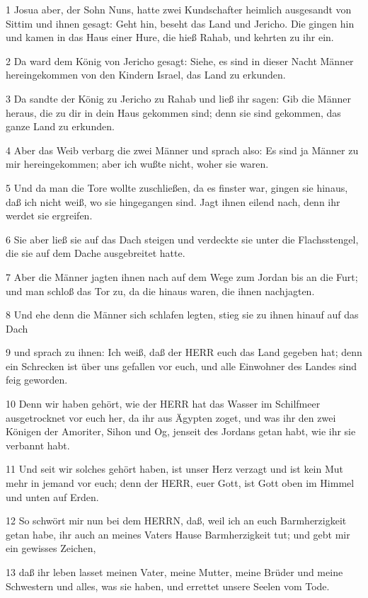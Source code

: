 \par 1 Josua aber, der Sohn Nuns, hatte zwei Kundschafter heimlich ausgesandt von Sittim und ihnen gesagt: Geht hin, beseht das Land und Jericho. Die gingen hin und kamen in das Haus einer Hure, die hieß Rahab, und kehrten zu ihr ein.
\par 2 Da ward dem König von Jericho gesagt: Siehe, es sind in dieser Nacht Männer hereingekommen von den Kindern Israel, das Land zu erkunden.
\par 3 Da sandte der König zu Jericho zu Rahab und ließ ihr sagen: Gib die Männer heraus, die zu dir in dein Haus gekommen sind; denn sie sind gekommen, das ganze Land zu erkunden.
\par 4 Aber das Weib verbarg die zwei Männer und sprach also: Es sind ja Männer zu mir hereingekommen; aber ich wußte nicht, woher sie waren.
\par 5 Und da man die Tore wollte zuschließen, da es finster war, gingen sie hinaus, daß ich nicht weiß, wo sie hingegangen sind. Jagt ihnen eilend nach, denn ihr werdet sie ergreifen.
\par 6 Sie aber ließ sie auf das Dach steigen und verdeckte sie unter die Flachsstengel, die sie auf dem Dache ausgebreitet hatte.
\par 7 Aber die Männer jagten ihnen nach auf dem Wege zum Jordan bis an die Furt; und man schloß das Tor zu, da die hinaus waren, die ihnen nachjagten.
\par 8 Und ehe denn die Männer sich schlafen legten, stieg sie zu ihnen hinauf auf das Dach
\par 9 und sprach zu ihnen: Ich weiß, daß der HERR euch das Land gegeben hat; denn ein Schrecken ist über uns gefallen vor euch, und alle Einwohner des Landes sind feig geworden.
\par 10 Denn wir haben gehört, wie der HERR hat das Wasser im Schilfmeer ausgetrocknet vor euch her, da ihr aus Ägypten zoget, und was ihr den zwei Königen der Amoriter, Sihon und Og, jenseit des Jordans getan habt, wie ihr sie verbannt habt.
\par 11 Und seit wir solches gehört haben, ist unser Herz verzagt und ist kein Mut mehr in jemand vor euch; denn der HERR, euer Gott, ist Gott oben im Himmel und unten auf Erden.
\par 12 So schwört mir nun bei dem HERRN, daß, weil ich an euch Barmherzigkeit getan habe, ihr auch an meines Vaters Hause Barmherzigkeit tut; und gebt mir ein gewisses Zeichen,
\par 13 daß ihr leben lasset meinen Vater, meine Mutter, meine Brüder und meine Schwestern und alles, was sie haben, und errettet unsere Seelen vom Tode.
